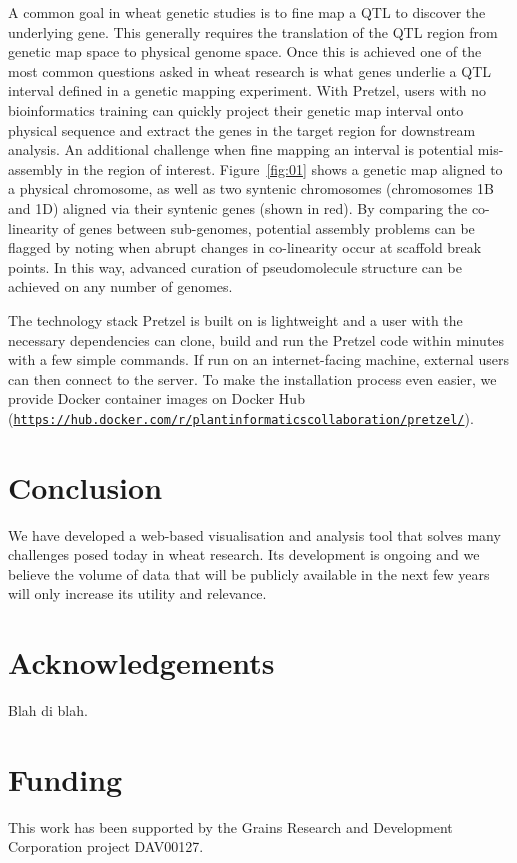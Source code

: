 A common goal in wheat genetic studies is to fine map a QTL to discover the underlying gene. This generally requires the translation of the
  QTL region from genetic map space to physical genome space. Once this is achieved one of the most common questions asked in wheat research 
  is what genes underlie a QTL interval defined in a genetic mapping experiment. 
%
With Pretzel, users with no bioinformatics training can quickly project their genetic map interval
  onto physical sequence and extract the genes in the target region for downstream analysis. 
%
An additional challenge when fine mapping an interval is potential mis-assembly in the region
  of interest. Figure~\ref{fig:01} shows a genetic map aligned to a physical chromosome, as well as
  two syntenic chromosomes (chromosomes 1B and 1D) aligned via their syntenic genes (shown in red). 
%
By comparing the co-linearity of genes between sub-genomes, potential assembly problems can be
  flagged by noting when abrupt changes in co-linearity occur at scaffold break points. 
%
In this way, advanced curation of pseudomolecule structure can be achieved on any number of genomes.

The technology stack Pretzel is built on is lightweight and a user with the necessary dependencies
can clone, build and run the Pretzel code within minutes with a few simple commands. 
%
If run on an internet-facing machine, external users can then connect to the server.
%
To make the installation process even easier, we provide Docker container images on Docker Hub
(\href{https://hub.docker.com/r/plantinformaticscollaboration/pretzel/}{\nolinkurl{https://hub.docker.com/r/plantinformaticscollaboration/pretzel/}}).

\section{Conclusion}

We have developed a web-based visualisation and analysis tool that solves many challenges posed today in wheat research. 
%
Its development is ongoing and we believe the volume of data that will be publicly available in the next few years will only increase its utility and relevance.

\section*{Acknowledgements}

Blah di blah.

\section*{Funding}

This work has been supported by the Grains Research and Development Corporation project DAV00127.\vspace*{-12pt}




